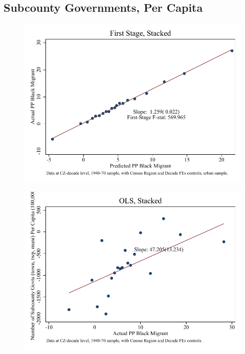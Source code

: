 \documentclass{article}
\begin{document}
\subsection{Subcounty Governments, Per Capita}

\clearpage
\begin{figure}
\centering
\includegraphics{figures/simplefigs/stacked_gen_subcounty_pc_C3_urban_fs.pdf}
\end{figure}
\clearpage
\begin{figure}
\centering
\includegraphics{figures/simplefigs/stacked_gen_subcounty_pc_C3_urban_ols.pdf}
\end{figure}
\clearpage
\end{document}
